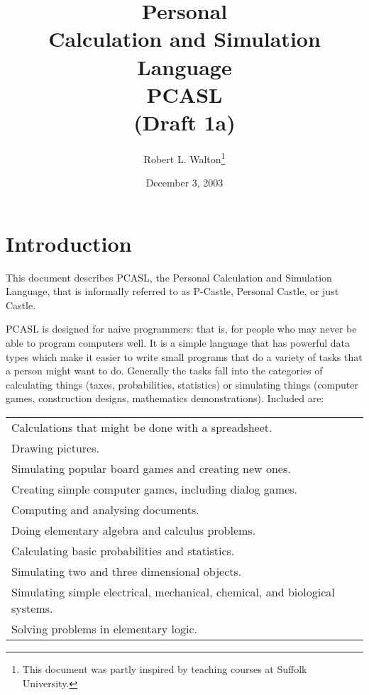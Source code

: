\documentclass[12pt]{article}
\makeatletter
\renewcommand\tableofcontents{%
    \begin{list}{}%
	     {\setlength{\itemsep}{0in}%
	      \setlength{\topsep}{0in}%
	      \setlength{\parsep}{1ex}%
	      \setlength{\labelwidth}{0in}%
	      \setlength{\baselineskip}{1.5ex}%
	      \setlength{\leftmargin}{1.0in}%
	      \setlength{\rightmargin}{1.0in}}%
    \item\@starttoc{toc}%
    \end{list}}
\makeatother
\begin{document}
        
\title{Personal\\Calculation and Simulation\\Language\\[2ex]PCASL\\[2ex]
       (Draft 1a)}

\author{Robert L. Walton\thanks{This document was partly inspired
by teaching courses at Suffolk University.}}

\date{December 3, 2003}
 
\maketitle

\tableofcontents 

\newpage

\section{Introduction}

This document describes PCASL, the Personal Calculation and Simulation
Language, that is informally referred to as P-Castle, Personal Castle, or just
Castle.

PCASL is designed for naive programmers: that is, for people who may never
be able to program computers well.  It is a simple language that has
powerful data types which make it easier to write small programs
that do a variety of tasks that a person might want to do.  Generally
the tasks fall into the categories of calculating things (taxes,
probabilities, statistics) or simulating things
(computer games, construction designs, mathematics demonstrations).
Included are:

\begin{center}
\begin{tabular}{l}
Calculations that might be done with a spreadsheet. \\
Drawing pictures. \\
Simulating popular board games and creating new ones. \\
Creating simple computer games, including dialog games. \\
Computing and analysing documents. \\
Doing elementary algebra and calculus problems. \\
Calculating basic probabilities and statistics. \\
Simulating two and three dimensional objects. \\
Simulating simple electrical, mechanical, chemical, and biological systems.\\
Solving problems in elementary logic. \\
\end{tabular}
\end{center}
\end{document}
